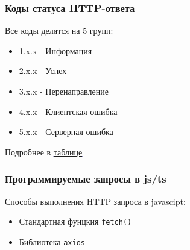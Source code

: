 \documentclass[aspectratio=169]{beamer}
\begin{document}
\begin{frame}
  \frametitle{Коды статуса HTTP-ответа}
  \begin{center}
    Все коды делятся на 5 групп:
  \end{center}
  
    \begin{itemize}
    \item 1.x.x - Информация
    \item 2.x.x - Успех
    \item 3.x.x - Перенаправление
    \item 4.x.x - Клиентская ошибка
    \item 5.x.x - Серверная ошибка
    \end{itemize}
    
    \begin{center}
    Подробнее в \textcolor{blue}{\underline{\href{assets/codes.png}{таблице}}}
  \end{center}
  
  \end{frame}


\begin{frame}
  \frametitle{Программируемые запросы в js/ts}
  \begin{center}
    Способы выполнения HTTP запроса в javascipt:
  \end{center}
  \begin{itemize}
  \item Стандартная фунцкия \texttt{fetch()}
  \item Библиотека \texttt{axios}
  \end{itemize}

  
\end{frame}
\end{document}
